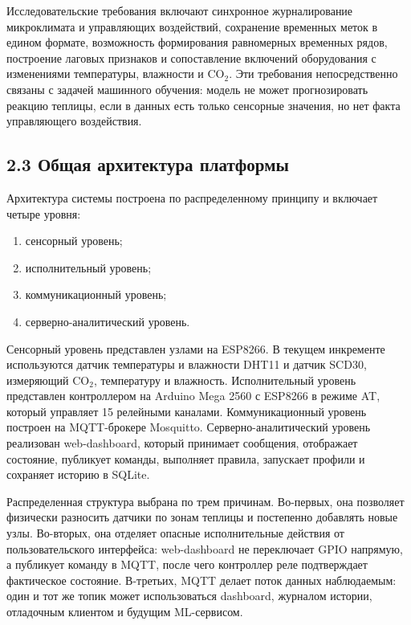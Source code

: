 \documentclass[a4paper,14pt]{extarticle}
\providecommand{\tightlist}{%
  \setlength{\itemsep}{0pt}\setlength{\parskip}{0pt}}
\begin{document}
Исследовательские требования включают синхронное журналирование
микроклимата и управляющих воздействий, сохранение временных меток в
едином формате, возможность формирования равномерных временных рядов,
построение лаговых признаков и сопоставление включений оборудования с
изменениями температуры, влажности и CO\(_2\). Эти требования
непосредственно связаны с задачей машинного обучения: модель не может
прогнозировать реакцию теплицы, если в данных есть только сенсорные
значения, но нет факта управляющего воздействия.

\hypertarget{ux43eux431ux449ux430ux44f-ux430ux440ux445ux438ux442ux435ux43aux442ux443ux440ux430-ux43fux43bux430ux442ux444ux43eux440ux43cux44b}{%
\subsection{2.3 Общая архитектура
платформы}\label{ux43eux431ux449ux430ux44f-ux430ux440ux445ux438ux442ux435ux43aux442ux443ux440ux430-ux43fux43bux430ux442ux444ux43eux440ux43cux44b}}

Архитектура системы построена по распределенному принципу и включает
четыре уровня:

\begin{enumerate}
\def\labelenumi{\arabic{enumi})}
\tightlist
\item
  сенсорный уровень;
\item
  исполнительный уровень;
\item
  коммуникационный уровень;
\item
  серверно-аналитический уровень.
\end{enumerate}

Сенсорный уровень представлен узлами на ESP8266. В текущем инкременте
используются датчик температуры и влажности DHT11 и датчик SCD30,
измеряющий CO\(_2\), температуру и влажность. Исполнительный уровень
представлен контроллером на Arduino Mega 2560 с ESP8266 в режиме AT,
который управляет 15 релейными каналами. Коммуникационный уровень
построен на MQTT-брокере Mosquitto. Серверно-аналитический уровень
реализован web-dashboard, который принимает сообщения, отображает
состояние, публикует команды, выполняет правила, запускает профили и
сохраняет историю в SQLite.

Распределенная структура выбрана по трем причинам. Во-первых, она
позволяет физически разносить датчики по зонам теплицы и постепенно
добавлять новые узлы. Во-вторых, она отделяет опасные исполнительные
действия от пользовательского интерфейса: web-dashboard не переключает
GPIO напрямую, а публикует команду в MQTT, после чего контроллер реле
подтверждает фактическое состояние. В-третьих, MQTT делает поток данных
наблюдаемым: один и тот же топик может использоваться dashboard,
журналом истории, отладочным клиентом и будущим ML-сервисом.
\end{document}
